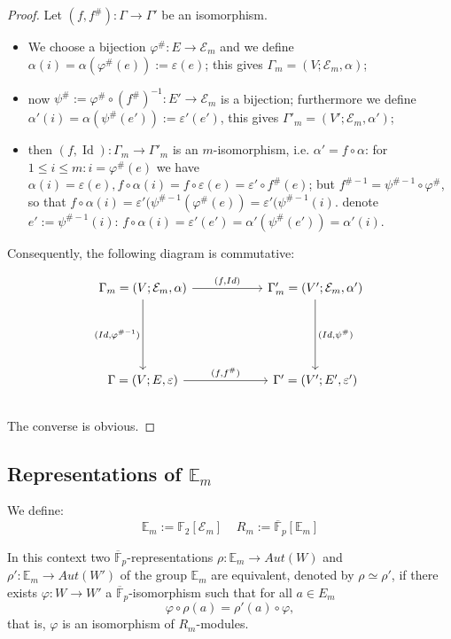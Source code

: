 \documentclass[preprint,12pt,authoryear]{elsarticle}
\theoremstyle{definition}
\DeclareMathOperator{\Id}{Id}
\begin{document}
\begin{proof}
Let $(f,f^{\#} ): \Gamma \longrightarrow \Gamma'$ be  an isomorphism.
\begin{itemize}
\item[-] We choose a bijection $\varphi^{\#}: E \longrightarrow \mathcal{E}_m$ and we define  $\alpha(i)=\alpha(\varphi^{\#}(e)) := \varepsilon(e)$; this gives $\Gamma_m=(V;\mathcal{E}_m,\alpha)$;
\item[-] now $\psi^{\#}:= \varphi^{\#} \circ (f^{\#})^{ -1}: E' \longrightarrow \mathcal{E}_m$ is a bijection; furthermore we define
$\alpha'(i)=\alpha(\psi^{\#}(e')) := \varepsilon'(e')$,  this gives $\Gamma'_m=(V';\mathcal{E}_m,\alpha')$;
\item[-]  then $(f,\Id): \Gamma_m \longrightarrow \Gamma'_m$ is an  $m$-isomorphism, i.e. $\alpha'=f \circ \alpha$:
for $1 \le i \le m: i=\varphi^{\#}(e)$ we have $\alpha(i)=\varepsilon(e), f\circ \alpha(i)=f \circ \varepsilon(e)=
\varepsilon' \circ f^{\#}(e)$; but $f^{\# -1}=\psi^{\# -1} \circ \varphi^{\#}$, so that $f \circ \alpha(i)=
\varepsilon'(\psi^{\#-1}(\varphi^{\#}(e))=\varepsilon'(\psi^{\#-1}(i)$. denote $e':= \psi^{\#-1}(i)$:
$f \circ \alpha(i)= \varepsilon'(e')=\alpha'(\psi^{\#}(e'))=\alpha'(i)$.
\end{itemize}
Consequently,  the following diagram is commutative:

\[ 
\begin{tikzcd}[sep=2cm]
 \Gamma_m= (V;\mathcal{E}_m,\alpha) \arrow{r}{(f,Id)} \arrow[swap]{d}{(Id,\varphi^{\#-1})} &\Gamma'_m= (V'; \mathcal{E}_m,\alpha')  \arrow{d}{(Id,\psi^{\#})} \\%
\Gamma  =(V;E,\varepsilon)  \arrow{r}{(f,f^{\#})}& \Gamma'=(V';E',\varepsilon')
\end{tikzcd}
\]\\
The converse is obvious.
\end{proof}



\subsection{Representations  of $\mathbb{E}_m$ }
We define: 
$$\mathbb{E}_m:=\mathbb{F}_2[\mathcal{E}_m] \;\;\;\;   R_m:= \overline{\mathbb{F}}_p[\mathbb{E}_m]$$

In this context  two  $\overline{\mathbb{F}}_p$-representations  $\rho: \mathbb{E}_m \longrightarrow Aut( W)$ and $\rho' : \mathbb{E}_m \longrightarrow Aut(W')$ of the group $\mathbb{E}_m$ are equivalent, denoted by $\rho \simeq \rho'$,  if there exists $\varphi :W \longrightarrow W'$ a $ \overline{\mathbb{F}}_p$-isomorphism such that for all $a \in {E}_m$
$$\varphi\circ \rho (a)= \rho'(a)\circ \varphi,$$
that is, $\varphi$ is an isomorphism of $R_m$-modules.
\end{document}
